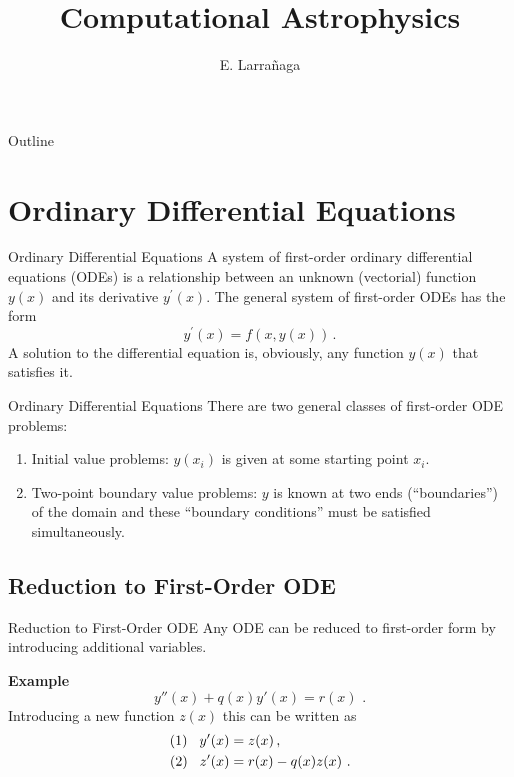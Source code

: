 \documentclass[11pt]{beamer}
\begin{document}
\begin{frame}
\title{Computational Astrophysics}
\author{E. Larrañaga}
\titlepage
\end{frame}

\begin{frame}{Outline}
\tableofcontents
\end{frame}

\section{Ordinary Differential Equations}
\begin{frame}[fragile]{Ordinary Differential Equations }
A system of first-order ordinary differential equations (ODEs)
is a relationship between an unknown (vectorial) function
$y(x)$ and its derivative $y^\prime(x)$. The
general system of first-order ODEs has the form
\begin{equation}
y^\prime (x) =f(x,y(x))\,.
\label{eq:odebasics}
\end{equation}
A solution to the differential equation is,
obviously, any function $y(x)$ that satisfies it.
\end{frame}

\begin{frame}[fragile]{Ordinary Differential Equations }
\noindent There are two general classes of first-order ODE problems:
\begin{enumerate}
\item Initial value problems: $y(x_i)$ is given at some starting
  point $x_i$.

\item Two-point boundary value problems: $y$ is known at two ends
  (``boundaries'') of the domain and these ``boundary conditions'' must
  be satisfied simultaneously.
\end{enumerate}
\end{frame}


\subsection{Reduction to First-Order ODE}
\begin{frame}[fragile]{Reduction to First-Order ODE}
Any ODE can be reduced to first-order form by introducing  additional
variables. \\
\bigskip

\textbf{Example}
\begin{equation}
y''(x) + q(x) y'(x) = r(x)\,\,.
\end{equation}
Introducing a new function $z(x)$ this can be written as
\begin{equation}
\begin{aligned}
\text{(1)}\hspace*{0.3cm} y'(x) &= z(x)\,,\nonumber\\
\text{(2)}\hspace*{0.3cm} z'(x) &= r(x) - q(x) z(x)\,\,.
\end{aligned}
\end{equation}
\end{frame}
\end{document}
